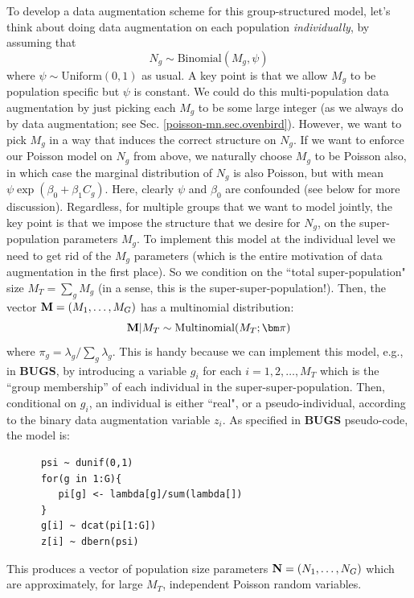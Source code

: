 To develop a data augmentation scheme for this group-structured model,
let's think about doing data augmentation on each population {\it
  individually}, by assuming that
\[
 N_{g} \sim \mbox{Binomial}(M_{g} , \psi)
\]
where $\psi \sim \mbox{Uniform}(0,1)$ as usual.  A key point is that
we allow $M_{g}$ to be population specific but $\psi$ is constant.  We
could do this multi-population data augmentation by just picking each
$M_{g}$ to be some large integer (as we always do by data
augmentation; see Sec. \ref{poisson-mn.sec.ovenbird}). However, we
want to pick $M_{g}$ in a way that induces
the correct structure on
$N_{g}$. If we want to enforce our Poisson model on $N_{g}$ from
above, we naturally choose $M_{g}$ to be Poisson also, in which case
the marginal distribution of $N_{g}$ is also Poisson, but with mean
$\psi \exp(\beta_{0} + \beta_{1}C_{g})$.  %
Here, clearly $\psi$ and
$\beta_{0}$ are confounded (see below for more discussion).
Regardless, for multiple groups that we want to model jointly, the
key point is that we
 impose the structure that we desire for $N_{g}$, on the
super-population parameters $M_{g}$.  To implement this model at the
individual level we need to get rid of the $M_{g}$ parameters (which
is the entire motivation of data augmentation in the first place). So
we condition on the ``total super-population" size $M_{T}= \sum_{g}
M_{g}$ (in a sense, this is the super-super-population!). Then, the vector ${\bf M} = (M_{1},\ldots,M_{G})$ has a
multinomial distribution:
\begin{equation}
{\bf M}|M_{T} \sim \mbox{Multinomial}(M_{T};  {\bm \pi} )
\label{eq.mn1}
\end{equation}
where
$\pi_{g} = \lambda_{g}/\sum_{g} \lambda_{g}$.  This is handy because
we can implement this model, e.g., in {\bf BUGS}, by introducing a
variable $g_{i}$ for each $i=1,2,\ldots, M_{T}$ which is the ``group
membership'' of each individual in the super-super-population.  Then,
conditional on $g_{i}$, an individual is either ``real", or a
pseudo-individual, according to the binary data augmentation variable
$z_{i}$.  As specified in {\bf BUGS} pseudo-code, the
model is:
\begin{verbatim}
      psi ~ dunif(0,1)
      for(g in 1:G){
         pi[g] <- lambda[g]/sum(lambda[])
      }
      g[i] ~ dcat(pi[1:G])
      z[i] ~ dbern(psi)
\end{verbatim}
This produces a vector of population size parameters ${\bf N} =
(N_{1},\ldots,N_{G})$ which are approximately, for large $M_{T}$,
independent Poisson random variables.

